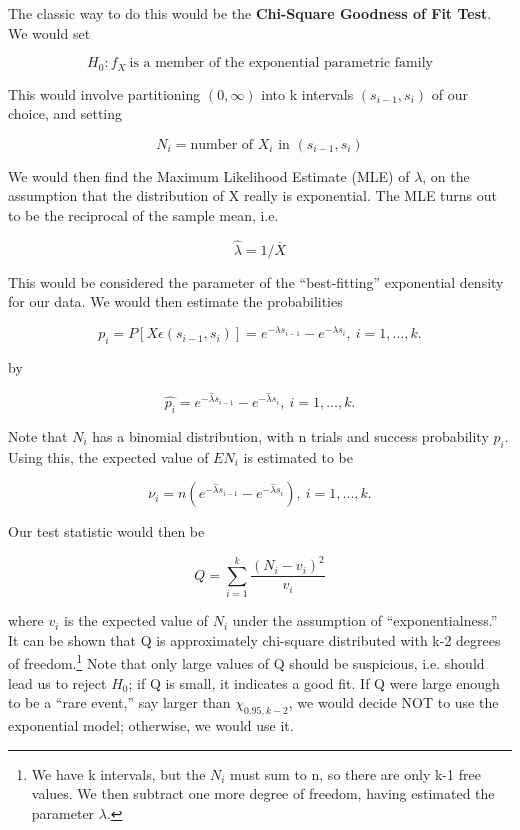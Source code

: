 The classic way to do this would be the {\bf Chi-Square Goodness of Fit
Test}.  We would set

\begin{equation}
H_0:  f_X ~ \textrm{is a member of the exponential parametric family}
\end{equation}

This would involve partitioning $(0,\infty)$ into k intervals
$(s_{i-1},s_i)$ of our choice, and setting 

\begin{equation}
N_i =  \textrm{number of } X_i \textrm{ in } (s_{i-1},s_i) 
\end{equation}

We would then find the Maximum Likelihood Estimate (MLE) of $\lambda$,
on the assumption that the distribution of X really is exponential.  The
MLE turns out to be the reciprocal of the sample mean, i.e. 

\begin{equation}
\widehat{\lambda} = 1/\overline{X}
\end{equation}

This would be considered the parameter of the ``best-fitting''
exponential density for our data.  We would then estimate the
probabilities

\begin{equation}
p_i = P[X \epsilon (s_{i-1},s_i)] = 
e^{-\lambda s_{i-1}} -
e^{-\lambda s_{i}}, ~ i = 1,...,k.
\end{equation}

by

\begin{equation}
\widehat{p_i} = 
e^{-\widehat{\lambda} s_{i-1}} -
e^{-\widehat{\lambda} s_{i}}, ~ i = 1,...,k.
\end{equation}

Note that $N_i$ has a binomial distribution, with n trials and success
probability $p_i$.  Using this, the expected value of $EN_i$ is
estimated to be

\begin{equation}
\nu_i = n(
e^{-\widehat{\lambda} s_{i-1}} -
e^{-\widehat{\lambda} s_{i}}), ~ i = 1,...,k.
\end{equation}

Our test statistic would then be

\begin{equation}
Q = \sum_{i=1}^k \frac{(N_i-v_i)^2}{v_i}
\end{equation}

where $v_i$ is the expected value of $N_i$ under the assumption of
``exponentialness.''  It can be shown that Q is approximately chi-square
distributed with k-2 degrees of freedom.\footnote{We have k intervals,
but the $N_i$ must sum to n, so there are only k-1 free values.  We then
subtract one more degree of freedom, having estimated the parameter
$\lambda$.}  Note that only large values of Q should be suspicious, i.e.
should lead us to reject $H_0$; if Q is small, it indicates a good fit.
If Q were large enough to be a ``rare event,'' say larger than
$\chi_{0.95,k-2}$, we would decide NOT to use the exponential model;
otherwise, we would use it.

